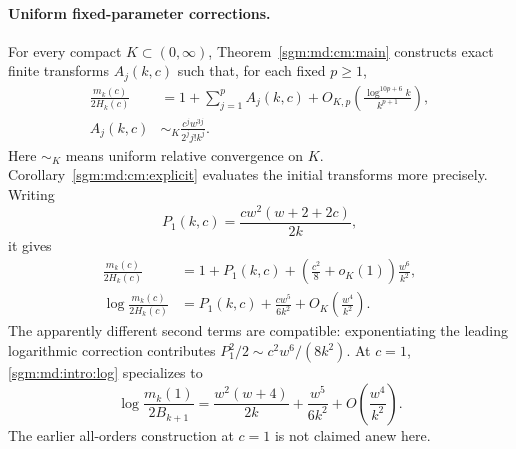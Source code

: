 \documentclass[11pt,letterpaper]{article}
\theoremstyle{remark}\newtheorem{remark}[theorem]{Remark}
\theoremstyle{definition}\newtheorem{definition}[theorem]{Definition}
\begin{document}
\paragraph{Uniform fixed-parameter corrections.}
For every compact $K\subset(0,\infty)$, Theorem~\ref{sgm:md:cm:main}
constructs exact finite transforms $A_j(k,c)$ such that, for each fixed
$p\ge1$,
\begin{align}
 \frac{m_k(c)}{2H_k(c)}
 &=1+\sum_{j=1}^p A_j(k,c)
   +O_{K,p}\!\left(\frac{\log^{10p+6}k}{k^{p+1}}\right),
 \label{sgm:md:intro:orders}\\
 A_j(k,c)&\sim_K\frac{c^jw^{3j}}{2^jj!k^j}.
 \label{sgm:md:intro:Aj}
\end{align}
Here $\sim_K$ means uniform relative convergence on $K$.
Corollary~\ref{sgm:md:cm:explicit} evaluates the initial transforms more
precisely. Writing
\begin{equation}\label{sgm:md:intro:P1}
 P_1(k,c)=\frac{cw^2(w+2+2c)}{2k},
\end{equation}
it gives
\begin{align}
 \frac{m_k(c)}{2H_k(c)}
 &=1+P_1(k,c)+\left(\frac{c^2}{8}+o_K(1)\right)
                        \frac{w^6}{k^2},\label{sgm:md:intro:additive}\\
 \log\frac{m_k(c)}{2H_k(c)}
 &=P_1(k,c)+\frac{cw^5}{6k^2}
                     +O_K\!\left(\frac{w^4}{k^2}\right).
 \label{sgm:md:intro:log}
\end{align}
The apparently different second terms are compatible: exponentiating
the leading logarithmic correction contributes
$P_1^2/2\sim c^2w^6/(8k^2)$. At $c=1$,
\eqref{sgm:md:intro:log} specializes to
\[
 \log\frac{m_k(1)}{2B_{k+1}}
 =\frac{w^2(w+4)}{2k}+\frac{w^5}{6k^2}
                         +O\!\left(\frac{w^4}{k^2}\right).
\]
The earlier all-orders construction at $c=1$ is not claimed anew here.
\end{document}
